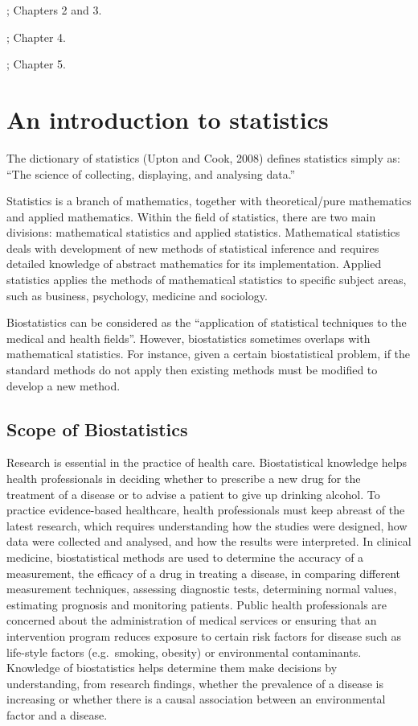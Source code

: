 \documentclass[
]{memoir}
\begin{document}
\citet{kirkwood_sterne01a}; Chapters 2 and 3.

\citet{bland15b}; Chapter 4.

\citet{acock10}; Chapter 5.

\hypertarget{an-introduction-to-statistics}{%
\section{An introduction to statistics}\label{an-introduction-to-statistics}}

The dictionary of statistics (Upton and Cook, 2008) defines statistics simply as: ``The science of collecting, displaying, and analysing data.''

Statistics is a branch of mathematics, together with theoretical/pure mathematics and applied mathematics. Within the field of statistics, there are two main divisions: mathematical statistics and applied statistics. Mathematical statistics deals with development of new methods of statistical inference and requires detailed knowledge of abstract mathematics for its implementation. Applied statistics applies the methods of mathematical statistics to specific subject areas, such as business, psychology, medicine and sociology.

Biostatistics can be considered as the ``application of statistical techniques to the medical and health fields''. However, biostatistics sometimes overlaps with mathematical statistics. For instance, given a certain biostatistical problem, if the standard methods do not apply then existing methods must be modified to develop a new method.

\hypertarget{scope-of-biostatistics}{%
\subsection{Scope of Biostatistics}\label{scope-of-biostatistics}}

Research is essential in the practice of health care. Biostatistical knowledge helps health professionals in deciding whether to prescribe a new drug for the treatment of a disease or to advise a patient to give up drinking alcohol. To practice evidence-based healthcare, health professionals must keep abreast of the latest research, which requires understanding how the studies were designed, how data were collected and analysed, and how the results were interpreted. In clinical medicine, biostatistical methods are used to determine the accuracy of a measurement, the efficacy of a drug in treating a disease, in comparing different measurement techniques, assessing diagnostic tests, determining normal values, estimating prognosis and monitoring patients. Public health professionals are concerned about the administration of medical services or ensuring that an intervention program reduces exposure to certain risk factors for disease such as life-style factors (e.g.~smoking, obesity) or environmental contaminants. Knowledge of biostatistics helps determine them make decisions by understanding, from research findings, whether the prevalence of a disease is increasing or whether there is a causal association between an environmental factor and a disease.
\end{document}
